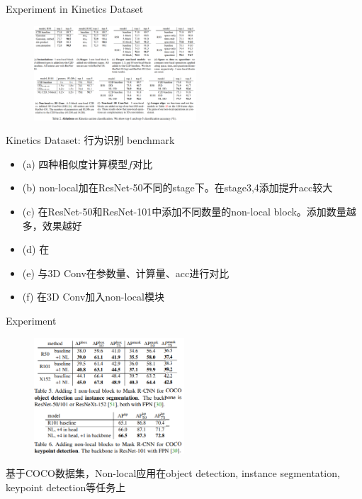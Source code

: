 \begin{frame}{Experiment in Kinetics Dataset}    
    \begin{multicols}{2}       
        \begin{figure}
            \centering
            \includegraphics[width=0.54\textwidth]{docs/paperReading/Non-local/exp.png}
        \end{figure}

        \begin{scriptsize}
            Kinetics Dataset: 行为识别 benchmark
            \begin{itemize}
                \item (a) 四种相似度计算模型$f$对比
                \item (b) non-local加在ResNet-50不同的stage下。在stage3,4添加提升acc较大
                \item (c) 在ResNet-50和ResNet-101中添加不同数量的non-local block。添加数量越多，效果越好
                \item (d) 在
                \item (e) 与3D Conv在参数量、计算量、acc进行对比
                \item (f) 在3D Conv加入non-local模块
            \end{itemize}
        \end{scriptsize}
    \end{multicols}
\end{frame}

\begin{frame}{Experiment}    
    \begin{figure}
        \centering
        \includegraphics[width=0.5\textwidth]{docs/paperReading/Non-local/assignment.png}
    \end{figure}

    \begin{scriptsize}
        基于COCO数据集，Non-local应用在object detection, instance segmentation, keypoint detection等任务上
    \end{scriptsize}
\end{frame}


